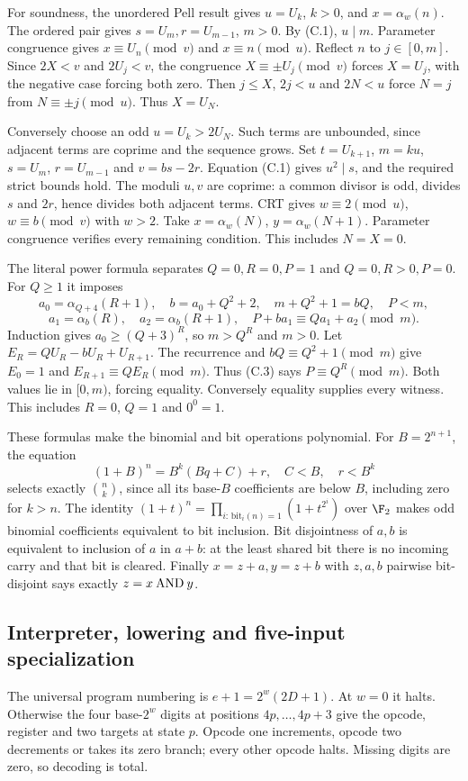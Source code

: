 For soundness, the unordered Pell result gives $u=U_k$, $k>0$,
and $x=\alpha_w(n)$. The ordered pair gives $s=U_m,r=U_{m-1}$,
$m>0$. By (C.1), $u\mid m$. Parameter congruence gives
$x\equiv U_n\pmod v$ and $x\equiv n\pmod u$.
Reflect $n$ to $j\in[0,m]$. Since $2X<v$ and $2U_j<v$,
the congruence $X\equiv\pm U_j\pmod v$ forces $X=U_j$,
with the negative case forcing both zero.
Then $j\le X$, $2j<u$ and $2N<u$ force $N=j$ from
$N\equiv\pm j\pmod u$. Thus $X=U_N$.

Conversely choose an odd $u=U_k>2U_N$. Such terms are unbounded,
since adjacent terms are coprime and the sequence grows.
Set $t=U_{k+1}$, $m=ku$, $s=U_m$, $r=U_{m-1}$ and $v=bs-2r$.
Equation (C.1) gives $u^2\mid s$, and the required strict bounds hold.
The moduli $u,v$ are coprime: a common divisor is odd, divides $s$
and $2r$, hence divides both adjacent terms. CRT gives
$w\equiv2\pmod u$, $w\equiv b\pmod v$ with $w>2$.
Take $x=\alpha_w(N)$, $y=\alpha_w(N+1)$.
Parameter congruence verifies every remaining condition.
This includes $N=X=0$.

The literal power formula separates $Q=0,R=0,P=1$ and
$Q=0,R>0,P=0$. For $Q\ge1$ it imposes
\[
 a_0=\alpha_{Q+4}(R+1),\quad b=a_0+Q^2+2,\quad
 m+Q^2+1=bQ,\quad P<m,
\]
\[
 a_1=\alpha_b(R),\quad a_2=\alpha_b(R+1),\quad
 P+ba_1\equiv Qa_1+a_2\pmod m.                                  \tag{C.3}
\]
Induction gives $a_0\ge(Q+3)^R$, so $m>Q^R$ and $m>0$.
Let $E_R=Q U_R-bU_R+U_{R+1}$. The recurrence and
$bQ\equiv Q^2+1\pmod m$ give $E_0=1$ and
$E_{R+1}\equiv QE_R\pmod m$. Thus (C.3) says $P\equiv Q^R\pmod m$.
Both values lie in $[0,m)$, forcing equality. Conversely equality
supplies every witness. This includes $R=0$, $Q=1$ and $0^0=1$.

These formulas make the binomial and bit operations polynomial.
For $B=2^{n+1}$, the equation
\[
 (1+B)^n=B^k(Bq+C)+r,\quad C<B,\quad r<B^k
\]
selects exactly $\binom nk$, since all its base-$B$ coefficients
are below $B$, including zero for $k>n$.
The identity
$(1+t)^n=\prod_{i:\,\text{bit}_i(n)=1}(1+t^{2^i})$ over $\F_2$
makes odd binomial coefficients equivalent to bit inclusion.
Bit disjointness of $a,b$ is equivalent to inclusion of $a$ in $a+b$:
at the least shared bit there is no incoming carry and that bit
is cleared. Finally $x=z+a,y=z+b$ with $z,a,b$ pairwise bit-disjoint
says exactly $z=x\mathbin{\rm AND}y$.

\subsection{Interpreter, lowering and five-input specialization}
The universal program numbering is $e+1=2^w(2D+1)$.
At $w=0$ it halts. Otherwise the four base-$2^w$ digits at positions
$4p,\ldots,4p+3$ give the opcode, register and two targets at state $p$.
Opcode one increments, opcode two decrements or takes its zero branch;
every other opcode halts. Missing digits are zero, so decoding is total.

